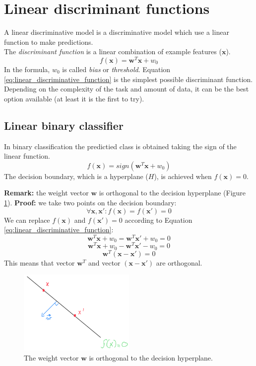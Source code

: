 \section{Linear discriminant functions}
A linear discriminative model is a discriminative model which use a linear function to make predictions.\\
The \textit{discriminant function} is a linear combination of example features ($\pmb{x}$).
\begin{equation}
\label{eq:linear_discriminative_function}
    f(\pmb{x}) = \pmb{w}^T \pmb{x} + w_0
\end{equation}
In the formula, $w_0$ is called \textit{bias} or \textit{threshold}. Equation \ref{eq:linear_discriminative_function} is the simplest possible discriminant function. Depending on the complexity of the task and amount of data, it can be the best option available (at least it is the first to try).

\subsection{Linear binary classifier}
In binary classification the predictied class is obtained taking the sign of the linear function.
\begin{equation}
    f(\pmb{x}) = \mathit{sign}(\pmb{w}^T \pmb{x} + w_0)
\end{equation}
The decision boundary, which is a hyperplane ($H$), is achieved when $f(\pmb{x})=0$. \newline

\textbf{Remark:} the weight vector $\pmb{w}$ is orthogonal to the decision hyperplane (Figure \ref{fig:linearBinaryClassifier}). \textbf{Proof:} we take two points on the decision boundary:
$$\forall \pmb{x}, \pmb{x}' : f(\pmb{x}) = f(\pmb{x}') = 0$$
We can replace $f(\pmb{x})$ and $f(\pmb{x}') = 0$ according to Equation \ref{eq:linear_discriminative_function}:
$$\pmb{w}^T \pmb{x} + w_0 = \pmb{w}^T \pmb{x}' + w_0 = 0$$
$$\pmb{w}^T \pmb{x} + w_0 - \pmb{w}^T \pmb{x}' - w_0 = 0$$
$$\pmb{w}^T (\pmb{x} - \pmb{x}') = 0$$
This means that vector $\pmb{w}^T$ and vector $(\pmb{x} - \pmb{x}')$ are orthogonal.

\begin{figure}
    \centering
    \includegraphics[width=0.5\textwidth]{images/linearBinaryClassifier.png}
    \caption{The weight vector $\pmb{w}$ is orthogonal to the decision hyperplane.}
    \label{fig:linearBinaryClassifier}
\end{figure}

